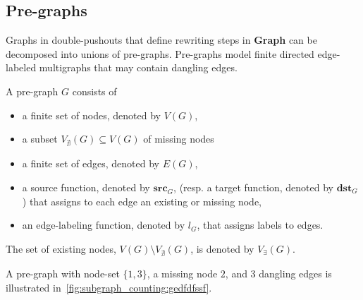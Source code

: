 \subsection{Pre-graphs}
Graphs in double-pushouts that define rewriting steps in \textbf{Graph} can be decomposed into unions of pre-graphs. Pre-graphs model finite directed edge-labeled multigraphs that may contain dangling edges.
\begin{definition}
    \label{def:pre-graph}
    A pre-graph $G$ consists of
    \begin{itemize}
        \item a finite set of nodes, denoted by $V(G)$,
        \item a subset $V_{\nexists}(G) \subseteq V(G)$ of missing nodes
        \item a finite set of edges, denoted by $E(G)$,
        \item a source function, denoted by \( \textbf{src}_G \), (resp. a target function, denoted by \( \textbf{dst}_G \)) that assigns to each edge an existing or missing node,
        \item an edge-labeling function, denoted by $l_G$, that assigns labels to edges.
    \end{itemize}
\end{definition} 
The set of existing nodes, $V(G) \setminus V_{\nexists}(G)$, is denoted by $V_\exists(G)$.

 \begin{example}
    \label{def:pregraph}
     A pre-graph with node-set $\{1,3\}$, a missing node $2$, and 3 dangling edges is illustrated in~\autoref{fig:subgraph_counting:gedfdfssf}.
     \begin{figure}[!ht]
        \centering
    \caption{}
    \label{fig:subgraph_counting:gedfdfssf}
    \end{figure}
 \end{example}
 
